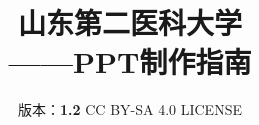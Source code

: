 

\title{%
    {\Huge\textbf{山东第二医科大学\\[5pt]——PPT制作指南}}%
}
\author{%
    版本：\textbf{1.2} \qquad%
    CC BY-SA 4.0 LICENSE \qquad%
    }
\date{\CurrentCustomTime}
\maketitle

\renewcommand{\thefootnote}{\arabic{footnote}}
